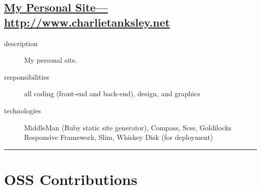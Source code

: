 \documentclass{article}
\begin{document}

\subsection{\href{http://www.charlietanksley.net}
  {My Personal Site---http://www.charlietanksley.net}}
\label{sub:My Personal Site}

\begin{multicols}{2}

\begin{description}
  \item[description] My personal site. 
  \item[responsibilities] all coding (front-end and back-end), design, and graphics 
  \item[technologies] MiddleMan (Ruby static site generator), Compass, Scss, Goldilocks Responsive Framework, Slim, Whiskey Disk (for deployment)
\end{description}

\vfill
\columnbreak
{}
\end{multicols}


\hrule
\section{OSS Contributions} %
\label{sec:OSS Contributions}
\end{document}
